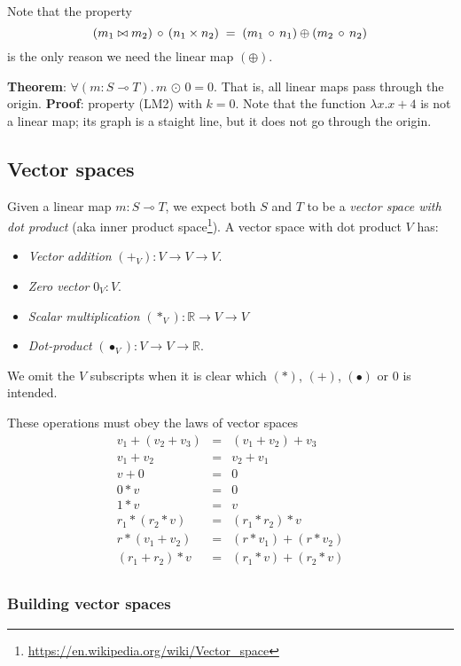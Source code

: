 \documentclass[sigplan,review]{acmart}
\renewcommand{\to}{\rightarrow}    %
\newcommand{\linto}{\multimap}     %
\newcommand{\tcolon}{\!:\!}
\newcommand{\real}{\mathbb{R}}       %
\newcommand{\dotprod}{\bullet}    %
\newcommand{\lmcomp}{\,\circ\,}   %
\newcommand{\lmpair}{\times}         %
\newcommand{\lmjoin}{\bowtie}        %
\newcommand{\lmapply}{\,\odot\,}      %
\newcommand{\lmadd}{\oplus}        %
\begin{document}
Note that the property
$$
(m_1 \lmjoin m_2) \lmcomp (n_1 \lmpair n_2) \; = \;  (m_1 \lmcomp n_1) \lmadd (m_2 \lmcomp n_2) \\
$$
is the only reason we need the linear map $(\lmadd)$.

{\bf Theorem}: $\forall (m \tcolon S \linto T).\, m \lmapply 0 = 0$.  That is, all linear maps
pass through the origin.  {\bf Proof}: property (LM2) with $k=0$.  Note that the function
$\lambda x. x+4$ is not a linear map; its graph is a staight line, but it does not
go through the origin.

\subsection{Vector spaces}

Given a linear map $m \tcolon S \linto T$, we expect both $S$ and $T$ to be
a \emph{vector space with dot product} (aka inner product space\footnote{\url{https://en.wikipedia.org/wiki/Vector_space}}).
A vector space with dot product $V$ has:
\begin{itemize}
\item \emph{Vector addition} $(+_V) : V \to V \to V$.
\item \emph{Zero vector} $0_V : V$.
\item \emph{Scalar multiplication} $(*_V) : \real \to V \to V$
\item \emph{Dot-product} $(\dotprod_V) : V \to V \to \real$.
\end{itemize}
We omit the $V$ subscripts when it is clear which $(*)$, $(+)$, $(\dotprod)$ or $0$ is intended.

These operations must obey the laws of vector spaces
$$
\begin{array}{rcl}
v_1 + (v_2 + v_3) & = & (v_1 + v_2) + v_3 \\
v_1 + v_2 & = & v_2 + v_1 \\
v + 0 & = & 0 \\
0 * v & = & 0 \\
1 * v & = & v \\
r_1 * ( r_2 * v) & = & (r_1 * r_2) * v \\
r * (v_1 + v_2) & = & (r * v_1) + (r * v_2) \\
(r_1 + r_2) * v & = & (r_1 * v) + (r_2 * v) \\
\end{array}
$$

\subsubsection{Building vector spaces}
\end{document}
